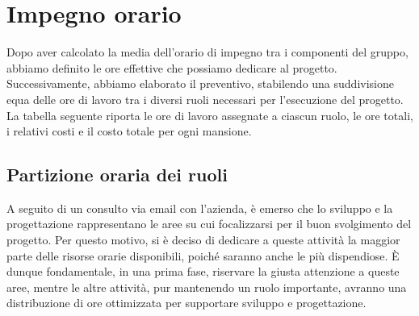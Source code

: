 \section{Impegno orario}

Dopo aver calcolato la media dell’orario di impegno tra i componenti del gruppo, abbiamo definito le ore effettive che possiamo dedicare al progetto. Successivamente, abbiamo elaborato il preventivo, stabilendo una suddivisione equa delle ore di lavoro tra i diversi ruoli necessari per l’esecuzione del progetto. La tabella seguente riporta le ore di lavoro assegnate a ciascun ruolo, le ore totali, i relativi costi e il costo totale per ogni mansione.

\vspace{0.5cm}

\begin{table}[h]
    \centering
    \caption{Ripartizione oraria e dettaglio dei costi}
\end{table}

\vspace{0.5cm}

\subsection{Partizione oraria dei ruoli}
A seguito di un consulto via email con l'azienda, è emerso che lo sviluppo e la progettazione rappresentano le aree su cui focalizzarsi per il buon svolgimento del progetto. Per questo motivo, si è deciso di dedicare a queste attività la maggior parte delle risorse orarie disponibili, poiché saranno anche le più dispendiose. È dunque fondamentale, in una prima fase, riservare la giusta attenzione a queste aree, mentre le altre attività, pur mantenendo un ruolo importante, avranno una distribuzione di ore ottimizzata per supportare sviluppo e progettazione.
